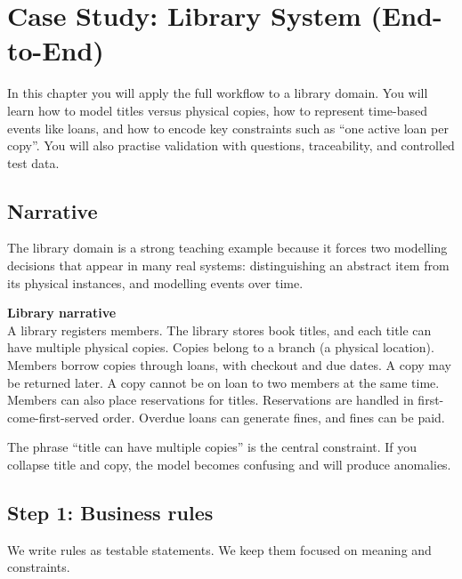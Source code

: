 \chapter{Case Study: Library System (End-to-End)}

\begin{learningobjectives}
In this chapter you will apply the full workflow to a library domain.
You will learn how to model titles versus physical copies, how to represent time-based events like loans, and how to encode key constraints such as “one active loan per copy”.
You will also practise validation with questions, traceability, and controlled test data.
\end{learningobjectives}

\section{Narrative}
The library domain is a strong teaching example because it forces two modelling decisions that appear in many real systems:
distinguishing an abstract item from its physical instances, and modelling events over time.

\begin{examplebox}
\textbf{Library narrative}\\
A library registers members.
The library stores book titles, and each title can have multiple physical copies.
Copies belong to a branch (a physical location).
Members borrow copies through loans, with checkout and due dates.
A copy may be returned later.
A copy cannot be on loan to two members at the same time.
Members can also place reservations for titles.
Reservations are handled in first-come-first-served order.
Overdue loans can generate fines, and fines can be paid.
\end{examplebox}

The phrase “title can have multiple copies” is the central constraint.
If you collapse title and copy, the model becomes confusing and will produce anomalies.

\section{Step 1: Business rules}
We write rules as testable statements.
We keep them focused on meaning and constraints.

